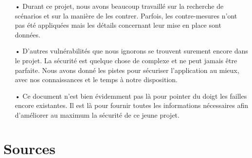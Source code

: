 \documentclass[12pt]{article}
\begin{document}
\begin{itemize}
\item[•] Durant ce projet, nous avons beaucoup travaillé sur la recherche de scénarios et sur la manière de les contrer. Parfois, les contre-mesures n'ont pas été appliquées mais les détails concernant leur mise en place sont données.
\item[•] D'autres vulnérabilités que nous ignorons se trouvent surement encore dans le projet. La sécurité est quelque chose de complexe et ne peut jamais être parfaite. Nous avons donné les pistes pour sécuriser l'application au mieux, avec nos connaissances et le temps à notre disposition.
\item[•] Ce document n'est bien évidemment pas là pour pointer du doigt les failles encore existantes. Il est là pour fournir toutes les informations nécessaires afin d'améliorer au maximum la sécurité de ce jeune projet.
\end{itemize}


\section{Sources}
\label{sec:sources}
\end{document}
